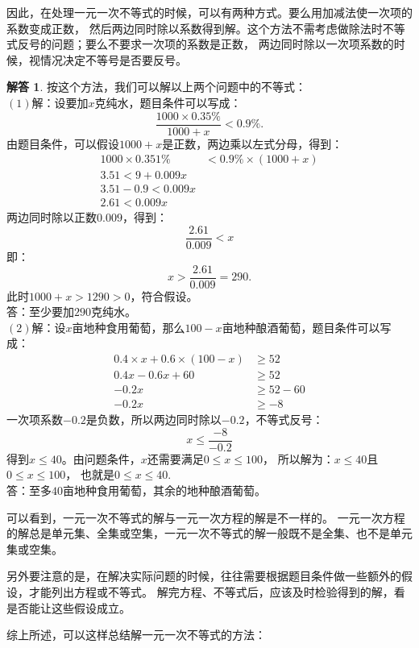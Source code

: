 \documentclass[12pt,UTF8]{ctexbook}
\theoremstyle{definition}
\newtheorem*{so}{解答}
\theoremstyle{plain}
\begin{document}
因此，在处理一元一次不等式的时候，可以有两种方式。要么用加减法使一次项的系数变成正数，
然后两边同时除以系数得到解。这个方法不需考虑做除法时不等式反号的问题；要么不要求一次项的系数是正数，
两边同时除以一次项系数的时候，视情况决定不等号是否要反号。
\begin{so}
    按这个方法，我们可以解以上两个问题中的不等式：\\
    $(1)$解：设要加$x$克纯水，题目条件可以写成：
    $$ \frac{1000 \times 0.35\%}{1000 + x} < 0.9\%.$$
    由题目条件，可以假设$1000+x$是正数，两边乘以左式分母，得到：
    \begin{align*}
        1000 \times 0.351\% &< 0.9\% \times (1000 + x)  \\
        3.51 < 9 + 0.009x  \\
        3.51 - 0.9 < 0.009x  \\
        2.61 < 0.009x 
    \end{align*}
    两边同时除以正数$0.009$，得到：
    $$ \frac{2.61}{0.009} < x$$
    即：
    $$ x > \frac{2.61}{0.009} = 290.$$
    此时$1000+x > 1290 > 0$，符合假设。\\
    答：至少要加$290$克纯水。\\
    $(2)$解：设$x$亩地种食用葡萄，那么$100 - x$亩地种酿酒葡萄，题目条件可以写成：
    \begin{align*}
        0.4 \times x + 0.6 \times (100 - x) &\geqslant 52  \\
        0.4x - 0.6x + 60 &\geqslant 52  \\
        -0.2x &\geqslant 52 - 60  \\
        -0.2x &\geqslant -8 
    \end{align*}
    一次项系数$-0.2$是负数，所以两边同时除以$-0.2$，不等式反号：
    $$ x \leqslant \frac{-8}{-0.2}$$
    得到$x \leqslant 40$。由问题条件，$x$还需要满足$0 \leqslant x \leqslant 100$，
    所以解为：$x \leqslant 40$且$0 \leqslant x \leqslant 100$，
    也就是$0 \leqslant x \leqslant 40$.\\
    答：至多$40$亩地种食用葡萄，其余的地种酿酒葡萄。
\end{so}
可以看到，一元一次不等式的解与一元一次方程的解是不一样的。
一元一次方程的解总是单元集、全集或空集，一元一次不等式的解一般既不是全集、也不是单元集或空集。

另外要注意的是，在解决实际问题的时候，往往需要根据题目条件做一些额外的假设，才能列出方程或不等式。
解完方程、不等式后，应该及时检验得到的解，看是否能让这些假设成立。

综上所述，可以这样总结解一元一次不等式的方法：
\end{document}
